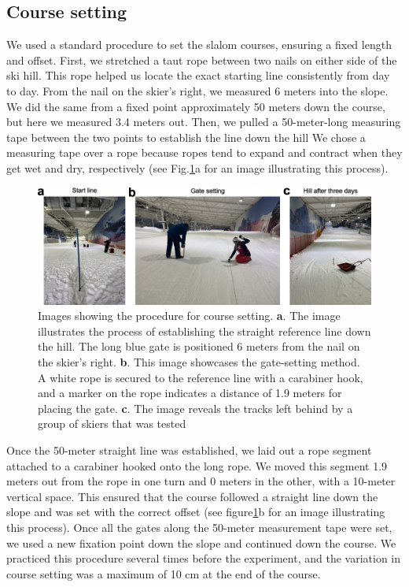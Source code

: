 \documentclass[pdflatex,sn-mathphys-num]{sn-jnl}%
\theoremstyle{thmstyleone}%
\theoremstyle{thmstyletwo}%
\theoremstyle{thmstylethree}%
\begin{document}
\begin{appendices}
\section{Course setting}\label{sup_coursesetting}
We used a standard procedure to set the slalom courses, ensuring a fixed length and offset. First, we stretched a taut rope between two nails on either side of the ski hill. This rope helped us locate the exact starting line consistently from day to day. From the nail on the skier's right, we measured 6 meters into the slope. We did the same from a fixed point approximately 50 meters down the course, but here we measured 3.4 meters out. Then, we pulled a 50-meter-long measuring tape between the two points to establish the line down the hill   We chose a measuring tape over a rope because ropes tend to expand and contract when they get wet and dry, respectively (see Fig.\ref{fig:coursesetting}a for an image illustrating this process).

\begin{figure}[H]
\centering
\includegraphics[width=\linewidth]{figures/figure_appendix_coursesetting_2.jpg}
\caption{Images showing the procedure for course setting. \textbf{a}. The image illustrates the process of establishing the straight reference line down the hill. The long blue gate is positioned 6 meters from the nail on the skier's right. \textbf{b}. This image showcases the gate-setting method. A white rope is secured to the reference line with a carabiner hook, and a marker on the rope indicates a distance of 1.9 meters for placing the gate. \textbf{c}. The image reveals the tracks left behind by a group of skiers that was tested
}
\label{fig:coursesetting}
\end{figure}
 

Once the 50-meter straight line was established, we laid out a rope segment attached to a carabiner hooked onto the long rope. We moved this segment 1.9 meters out from the rope in one turn and 0 meters in the other, with a 10-meter vertical space. This ensured that the course followed a straight line down the slope and was set with the correct offset (see figure\ref{fig:coursesetting}b for an image illustrating this process). Once all the gates along the 50-meter measurement tape were set, we used a new fixation point down the slope and continued down the course. We practiced this procedure several times before the experiment, and the variation in course setting was a maximum of 10 cm at the end of the course.


\end{appendices}
\end{document}
